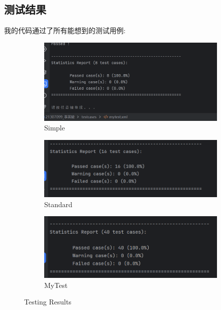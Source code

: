 \documentclass{article}
\begin{document}
\subsection{测试结果}
我的代码通过了所有能想到的测试用例:
\begin{figure}[htbp]
    \centering
    \begin{subfigure}[b]{0.5\textwidth}
        \centering
        \includegraphics[width=\linewidth]{simple.png}
        \caption{Simple}
        \label{fig:simple}
    \end{subfigure}
    \begin{subfigure}[b]{0.5\textwidth}
        \centering
        \includegraphics[width=\linewidth]{standard.png}
        \caption{Standard}
        \label{fig:standard}
    \end{subfigure}
    
    \begin{subfigure}[b]{0.5\textwidth}
        \centering
        \includegraphics[width=\linewidth]{mytest.png}
        \caption{MyTest}
        \label{fig:mytest}
    \end{subfigure}
    \caption{Testing Results}
    \label{fig:combined}
\end{figure}
\newpage
\end{document}
